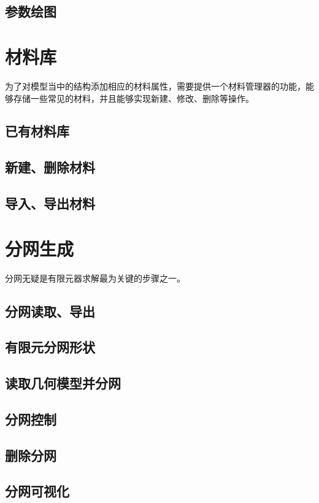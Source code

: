 \subsection{参数绘图}

\section{材料库}
为了对模型当中的结构添加相应的材料属性，需要提供一个材料管理器的功能，能够存储一些常见的材料，并且能够实现新建、修改、删除等操作。
\subsection{已有材料库}

\subsection{新建、删除材料}

\subsection{导入、导出材料}

\section{分网生成}
分网无疑是有限元器求解最为关键的步骤之一。
\subsection{分网读取、导出}

\subsection{有限元分网形状}

\subsection{读取几何模型并分网}

\subsection{分网控制}

\subsection{删除分网}

\subsection{分网可视化}

